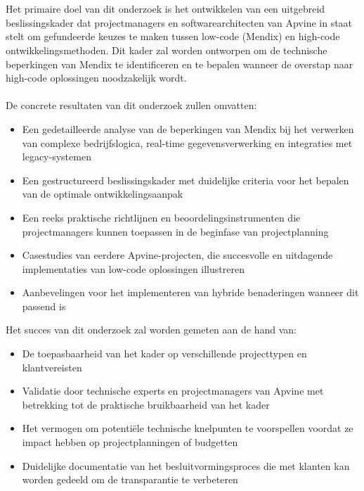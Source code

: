 \section{}%
\label{sec:onderzoeksdoelstelling}
Het primaire doel van dit onderzoek is het ontwikkelen van een uitgebreid beslissingskader dat projectmanagers en softwarearchitecten van Apvine in staat stelt om gefundeerde keuzes te maken tussen low-code (Mendix) en high-code ontwikkelingsmethoden. Dit kader zal worden ontworpen om de technische beperkingen van Mendix te identificeren en te bepalen wanneer de overstap naar high-code oplossingen noodzakelijk wordt.
\\
\\
De concrete resultaten van dit onderzoek zullen omvatten:
\begin{itemize}
\item Een gedetailleerde analyse van de beperkingen van Mendix bij het verwerken van complexe bedrijfslogica, real-time gegevensverwerking en integraties met legacy-systemen
\item Een gestructureerd beslissingskader met duidelijke criteria voor het bepalen van de optimale ontwikkelingsaanpak
\item Een reeks praktische richtlijnen en beoordelingsinstrumenten die projectmanagers kunnen toepassen in de beginfase van projectplanning
\item Casestudies van eerdere Apvine-projecten, die succesvolle en uitdagende implementaties van low-code oplossingen illustreren
\item Aanbevelingen voor het implementeren van hybride benaderingen wanneer dit passend is
\end{itemize}


Het succes van dit onderzoek zal worden gemeten aan de hand van:
\begin{itemize}
\item De toepasbaarheid van het kader op verschillende projecttypen en klantvereisten
\item Validatie door technische experts en projectmanagers van Apvine met betrekking tot de praktische bruikbaarheid van het kader
\item Het vermogen om potentiële technische knelpunten te voorspellen voordat ze impact hebben op projectplanningen of budgetten
\item Duidelijke documentatie van het besluitvormingsproces die met klanten kan worden gedeeld om de transparantie te verbeteren
\end{itemize}


